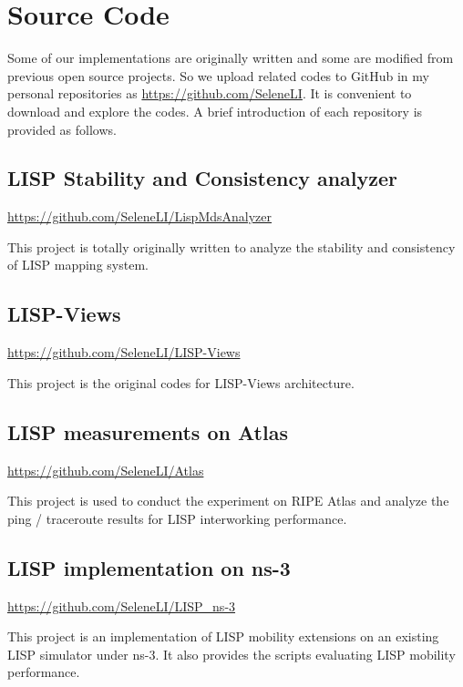 \chapter{Source Code} 
Some of our implementations are originally written and some are modified from previous open source projects. So we upload related codes to GitHub in my personal repositories as \url{https://github.com/SeleneLI}. It is convenient to download and explore the codes. A brief introduction of each repository is provided as follows.


\section{LISP Stability and Consistency analyzer}
\url{https://github.com/SeleneLI/LispMdsAnalyzer}

This project is totally originally written to analyze the stability and consistency of LISP mapping system.


\section{LISP-Views}
\url{https://github.com/SeleneLI/LISP-Views}

This project is the original codes for LISP-Views architecture.


\section{LISP measurements on Atlas}
\url{https://github.com/SeleneLI/Atlas}

This project is used to conduct the experiment on RIPE Atlas and analyze the ping / traceroute results for LISP interworking performance. 


\section{LISP implementation on ns-3}
\url{https://github.com/SeleneLI/LISP_ns-3}

This project is an implementation of LISP mobility extensions on an existing LISP simulator under ns-3. It also provides the scripts evaluating LISP mobility performance.





